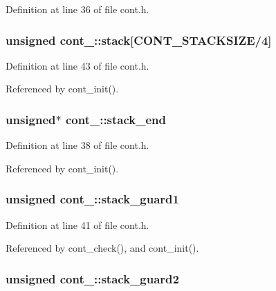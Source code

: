 Definition at line 36 of file cont.\-h.

\hypertarget{structcont___abc9f985ead0aa2c6795818c0bce6f9c1}{
\subsubsection[{stack}]{\setlength{\rightskip}{0pt plus 5cm}unsigned cont\-\_\-\-::stack\mbox{[}{\bf C\-O\-N\-T\-\_\-\-S\-T\-A\-C\-K\-S\-I\-Z\-E}/4\mbox{]}}}\label{structcont___abc9f985ead0aa2c6795818c0bce6f9c1}


Definition at line 43 of file cont.\-h.



Referenced by cont\-\_\-init().

\hypertarget{structcont___ab6e542a519497e515e2d3a62030a1f61}{
\subsubsection[{stack\-\_\-end}]{\setlength{\rightskip}{0pt plus 5cm}unsigned$\ast$ cont\-\_\-\-::stack\-\_\-end}}\label{structcont___ab6e542a519497e515e2d3a62030a1f61}


Definition at line 38 of file cont.\-h.



Referenced by cont\-\_\-init().

\hypertarget{structcont___a17c9f5d8bc954cc0381bdbe63d350048}{
\subsubsection[{stack\-\_\-guard1}]{\setlength{\rightskip}{0pt plus 5cm}unsigned cont\-\_\-\-::stack\-\_\-guard1}}\label{structcont___a17c9f5d8bc954cc0381bdbe63d350048}


Definition at line 41 of file cont.\-h.



Referenced by cont\-\_\-check(), and cont\-\_\-init().

\hypertarget{structcont___af9e24c89ac69a95ae78a6c7f8a237da0}{
\subsubsection[{stack\-\_\-guard2}]{\setlength{\rightskip}{0pt plus 5cm}unsigned cont\-\_\-\-::stack\-\_\-guard2}}\label{structcont___af9e24c89ac69a95ae78a6c7f8a237da0}


